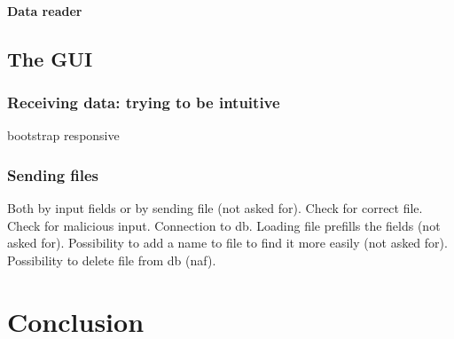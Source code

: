\documentclass{themeensg}
\begin{document}
\subsubsection{Data reader}

\clearpage
\section{The GUI}
\subsection{Receiving data: trying to be intuitive}

bootstrap
responsive


\newpage
\subsection{Sending files}

Both by input fields or by sending file (not asked for). Check for correct file. Check for malicious input. Connection to db. Loading file prefills the fields (not asked for). Possibility to add a name to file to find it more easily (not asked for). Possibility to delete file from db (naf). 
\newevenpage
\chapter*{Conclusion}
  \vspace{1.5cm}

\newevenpage
\begin{appendices} 
\label{beginappendices}

\label{configfile}



\end{appendices}
\end{document}
